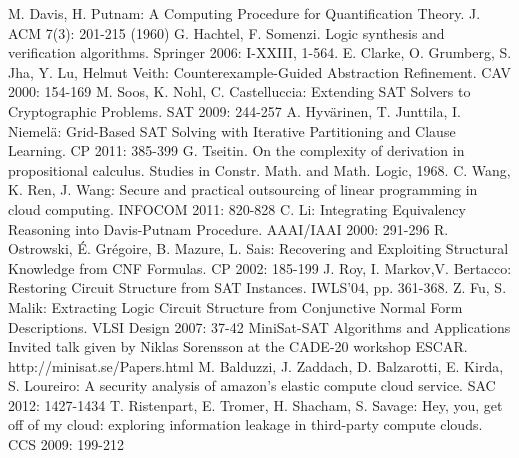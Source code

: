 \documentclass[conference,compsocconf]{IEEEtran}
\begin{document}
%
%
%
\begin{thebibliography}{26}

M. Davis, H. Putnam: A Computing Procedure for Quantification Theory. J. ACM 7(3): 201-215 (1960)
G. Hachtel, F. Somenzi.
Logic synthesis and verification algorithms. Springer 2006: I-XXIII, 1-564.
E. Clarke, O. Grumberg, S. Jha, Y. Lu, Helmut Veith: Counterexample-Guided Abstraction Refinement. CAV 2000: 154-169
M. Soos, K. Nohl, C. Castelluccia: Extending SAT Solvers to Cryptographic Problems. SAT 2009: 244-257
A. Hyv\"arinen, T. Junttila, I. Niemel\"a: Grid-Based SAT Solving with Iterative Partitioning and Clause Learning. CP 2011: 385-399
G. Tseitin.
On the complexity of derivation in propositional calculus. Studies in Constr. Math. and Math. Logic, 1968.
C. Wang, K. Ren, J. Wang: Secure and practical outsourcing of linear programming in cloud computing. INFOCOM 2011: 820-828
C. Li: Integrating Equivalency Reasoning into Davis-Putnam Procedure. AAAI/IAAI 2000: 291-296
R. Ostrowski, \'E. Gr\'egoire, B. Mazure, L. Sais: Recovering and Exploiting Structural Knowledge from CNF Formulas. CP 2002: 185-199
J. Roy, I. Markov,V. Bertacco:
Restoring Circuit Structure from SAT Instances. IWLS'04, pp. 361-368.
Z. Fu, S. Malik: Extracting Logic Circuit Structure from Conjunctive Normal Form Descriptions. VLSI Design 2007: 37-42
MiniSat-SAT Algorithms and Applications Invited talk given by Niklas Sorensson at the CADE-20 workshop ESCAR.
http://minisat.se/Papers.html
M. Balduzzi, J. Zaddach, D. Balzarotti, E. Kirda, S. Loureiro: A security analysis of amazon's elastic compute cloud service. SAC 2012: 1427-1434
T. Ristenpart, E. Tromer, H. Shacham, S. Savage: Hey, you, get off of my cloud: exploring information leakage in third-party compute clouds. CCS 2009: 199-212

\end{thebibliography}
\end{document}
